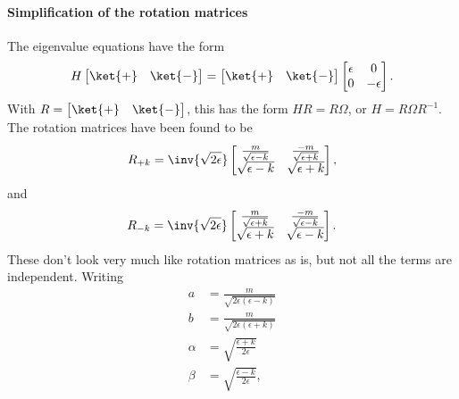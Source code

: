 \paragraph{Simplification of the rotation matrices}
The eigenvalue equations have the form
%
\begin{equation}\label{eqn:gradQuantumProblemSet4Problem3:240}
H
\begin{bmatrix}
\ket{+} & \ket{-}
\end{bmatrix}
=
\begin{bmatrix}
\ket{+} & \ket{-}
\end{bmatrix}
\begin{bmatrix}
\epsilon & 0 \\
0 & -\epsilon
\end{bmatrix}.
\end{equation}
With \( R = \begin{bmatrix} \ket{+} & \ket{-} \end{bmatrix} \), this has the form \( H R = R \Omega \), or \( H = R \Omega R^{-1} \).  The rotation matrices have been found to be
%
\begin{equation}\label{eqn:gradQuantumProblemSet4Problem3:260}
R_{+k}
=
\inv{\sqrt{2\epsilon}}
\begin{bmatrix}
\frac{m}{\sqrt{\epsilon - k}} & \frac{-m}{\sqrt{\epsilon + k}} \\
\sqrt{\epsilon - k} & \sqrt{\epsilon + k}
\end{bmatrix},
\end{equation}
%
and
\begin{equation}\label{eqn:gradQuantumProblemSet4Problem3:280}
R_{-k}
=
\inv{\sqrt{2\epsilon}}
\begin{bmatrix}
\frac{m}{\sqrt{\epsilon + k}} & \frac{-m}{\sqrt{\epsilon - k}} \\
\sqrt{\epsilon + k} & \sqrt{\epsilon - k}
\end{bmatrix}.
\end{equation}
%
These don't look very much like rotation matrices as is, but not all the terms are independent.  Writing
%
\begin{equation}\label{eqn:gradQuantumProblemSet4Problem3:300}
\begin{aligned}
a &= \frac{m}{\sqrt{2\epsilon(\epsilon - k)}} \\
b &= \frac{m}{\sqrt{2\epsilon(\epsilon + k)}} \\
\alpha &= \sqrt{\frac{\epsilon + k}{2 \epsilon}} \\
\beta &= \sqrt{\frac{\epsilon - k}{2 \epsilon}},
\end{aligned}
\end{equation}

